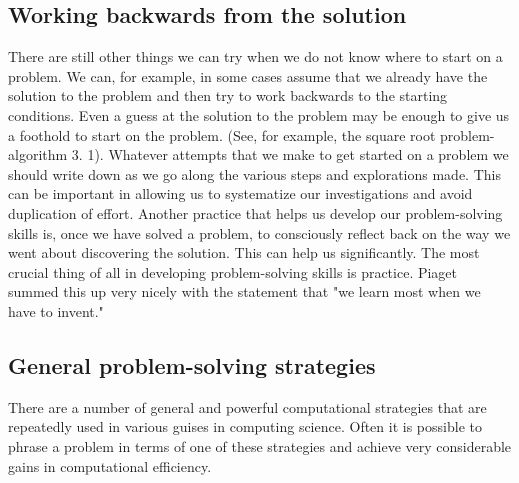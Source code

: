 \documentclass{book}
\begin{document}
\subsection{Working backwards from the  solution}
There are still other things we can try when we do not know where to start on a problem. We can, for example, in some cases assume that we already have the solution to the problem and then try to work backwards to the starting conditions. Even a guess at the solution to the problem may be enough to give us a foothold to start on the problem. (See, for example, the square root problem-algorithm 3. 1). Whatever attempts that we make to get started on a problem we should write down as we go along the various steps and explorations made. This can be important in allowing us to systematize our investigations and avoid duplication of effort. Another practice that helps us develop our problem-solving skills is, once we have solved a problem, to consciously reflect back on the way we went about discovering the solution. This can help us significantly. The most crucial thing of all in developing problem-solving skills is practice. Piaget summed this up very nicely with the statement that "we learn most when we have to invent."

\subsection{General problem-solving strategies}
There are a number of general and powerful computational strategies that are repeatedly used in various guises in computing science. Often it is possible to phrase a problem in terms of one of these strategies and achieve very considerable gains in computational efficiency.\par
\end{document}
